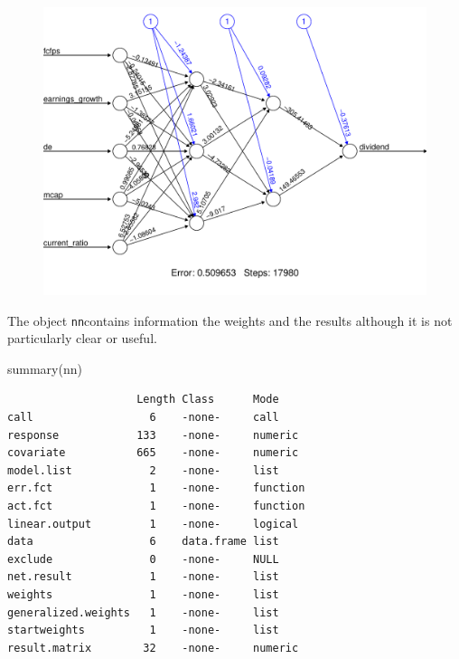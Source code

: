 \documentclass[
  letterpaper,
  DIV=11,
  numbers=noendperiod,
  oneside]{scrartcl}
\newenvironment{Shaded}{\begin{snugshade}}{\end{snugshade}}
\newcommand{\FunctionTok}[1]{\textcolor[rgb]{0.28,0.35,0.67}{#1}}
\newcommand{\NormalTok}[1]{\textcolor[rgb]{0.00,0.23,0.31}{#1}}
\begin{document}
\begin{figure}[H]

{\centering \includegraphics{Introduction_to_Deep_Learning_files/figure-pdf/unnamed-chunk-11-1.pdf}

}

\end{figure}

The object \texttt{nn}contains information the weights and the results
although it is not particularly clear or useful.

\begin{Shaded}
\begin{Highlighting}[]
\FunctionTok{summary}\NormalTok{(nn)}
\end{Highlighting}
\end{Shaded}

\begin{verbatim}
                    Length Class      Mode    
call                  6    -none-     call    
response            133    -none-     numeric 
covariate           665    -none-     numeric 
model.list            2    -none-     list    
err.fct               1    -none-     function
act.fct               1    -none-     function
linear.output         1    -none-     logical 
data                  6    data.frame list    
exclude               0    -none-     NULL    
net.result            1    -none-     list    
weights               1    -none-     list    
generalized.weights   1    -none-     list    
startweights          1    -none-     list    
result.matrix        32    -none-     numeric 
\end{verbatim}
\end{document}

